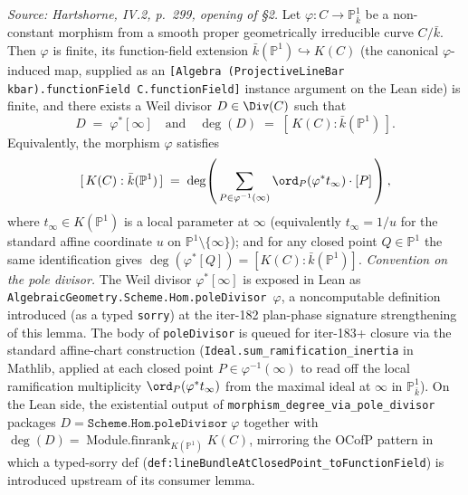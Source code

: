 \begin{lemma}
  \label{lem:degree_via_pole_divisor}
  
  \textit{Source: Hartshorne, IV.2, p.~299, opening of \S2.}
  Let \(\varphi \colon C \to \mathbb P^1_{\bar k}\) be a non-constant morphism
  from a smooth proper geometrically irreducible curve \(C / \bar k\). Then
  \(\varphi\) is finite, its function-field extension
  \(\bar k(\mathbb P^1) \hookrightarrow K(C)\) (the canonical
  \(\varphi\)-induced map, supplied as an
  \texttt{[Algebra (ProjectiveLineBar kbar).functionField C.functionField]}
  instance argument on the Lean side) is finite, and there exists a Weil
  divisor \(D \in \Div(C)\) such that
  \[
    D \;=\; \varphi^*[\infty]
    \quad\text{and}\quad
    \deg(D) \;=\; [\,K(C) : \bar k(\mathbb P^1)\,].
  \]
  Equivalently, the morphism \(\varphi\) satisfies
  \[
    [\,K(C) : \bar k(\mathbb P^1)\,] \;=\;
    \deg\!\left(\,\sum_{P \in \varphi^{-1}(\infty)}
                  \ord_P(\varphi^* t_\infty) \cdot [P]\,\right),
  \]
  where \(t_\infty \in K(\mathbb P^1)\) is a local parameter at \(\infty\)
  (equivalently \(t_\infty = 1/u\) for the standard affine coordinate \(u\) on
  \(\mathbb P^1 \setminus \{\infty\}\)); and for any closed point
  \(Q \in \mathbb P^1\) the same identification gives
  \(\deg(\varphi^*[Q]) = [K(C):\bar k(\mathbb P^1)]\).
  \emph{Convention on the pole divisor.} The Weil divisor
  \(\varphi^*[\infty]\) is exposed in Lean as
  \texttt{AlgebraicGeometry.Scheme.Hom.poleDivisor \(\varphi\)}, a
  noncomputable definition introduced (as a typed \texttt{sorry}) at the
  iter-182 plan-phase signature strengthening of this lemma. The body of
  \texttt{poleDivisor} is queued for iter-183+ closure via the standard
  affine-chart construction (\texttt{Ideal.sum\_ramification\_inertia}
  in Mathlib, applied at each closed point \(P \in \varphi^{-1}(\infty)\)
  to read off the local ramification multiplicity
  \(\ord_P(\varphi^* t_\infty)\) from the maximal ideal at \(\infty\) in
  \(\mathbb P^1_{\bar k}\)). On the Lean side, the existential output of
  \texttt{morphism\_degree\_via\_pole\_divisor} packages
  \(D = \texttt{Scheme.Hom.poleDivisor}\;\varphi\) together with
  \(\deg(D) = \operatorname{Module.finrank}_{K(\mathbb P^1)} K(C)\),
  mirroring the OCofP pattern in which a typed-sorry def
  (\texttt{def:lineBundleAtClosedPoint_toFunctionField}) is introduced
  upstream of its consumer lemma.
\end{lemma}
